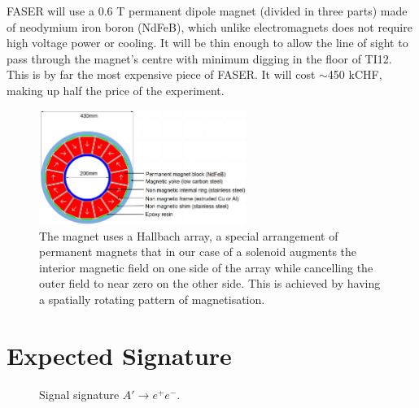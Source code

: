 FASER will use a 0.6 T permanent dipole magnet (divided in three parts) made of neodymium iron boron (NdFeB), which unlike electromagnets does not require high voltage power or cooling. It will be thin enough to allow the line of sight to pass through the magnet's centre with minimum digging in the floor of TI12. This is by far the most expensive piece of FASER. It will cost $\sim$450 kCHF, making up half the price of the experiment.

\begin{figure}[htbp!] 
\centering    
\includegraphics[width=0.6\textwidth]{ChapterFaser/Figs/Raster/MagnetDesign.jpg}
\caption[Magnet Design]{The magnet uses a Hallbach array, a special arrangement of permanent magnets that in our case of a solenoid augments the interior magnetic field on one side of the array while cancelling the outer field to near zero on the other side. This is achieved by having a spatially rotating pattern of magnetisation.
}
\label{fig:MagnetDesign}
\end{figure}

\section{Expected Signature}

\begin{figure}[htbp!] 
\centering    
\caption{Signal signature $A'\rightarrow e^{+}e^{-}$.}
\label{fig:SignalSignature}
\end{figure}

